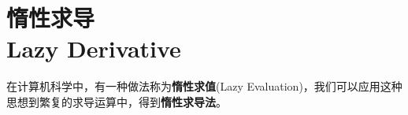 \chapter[惰性求导]{惰性求导 \\ Lazy Derivative}

在计算机科学中，有一种做法称为\textbf{惰性求值}(Lazy Evaluation)，我们可以应用这种思想到繁复的求导运算中，得到\textbf{惰性求导法}。